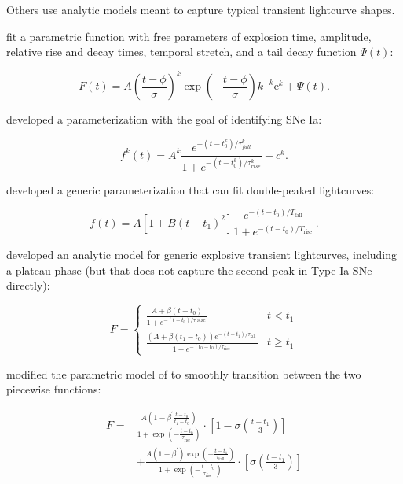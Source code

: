 \documentclass[DM,authoryear,toc]{lsstdoc}
\begin{document}
Others use analytic models meant to capture typical transient lightcurve shapes.

\citet{Newling:11:SNPhotCCClassification} fit a parametric function with free parameters of explosion time, amplitude, relative rise and decay times, temporal stretch, and a tail decay function $\Psi(t)$:

\begin{equation}
  F(t)=A\left(\frac{t-\phi}{\sigma}\right)^{k} \exp \left(-\frac{t-\phi}{\sigma}\right) k^{-k} \mathrm{e}^{k}+\Psi(t).
\end{equation}

\citet{Bazin:11:SNLSIas} developed a parameterization with the goal of identifying SNe Ia:

\begin{equation}
  f^{k}(t)=A^{k} \frac{e^{-\left(t-t_{0}^{k}\right) / \tau_{f a l l}^{k}}}{1+e^{-\left(t-t_{0}^{k}\right) / \tau_{r i s e}^{k}}}+c^{k}.
\end{equation}

\citet{Karpenka:13:SNClassification} developed a generic parameterization that can fit double-peaked lightcurves:

\begin{equation}
f(t)=A\left[1+B\left(t-t_{1}\right)^{2}\right] \frac{e^{-\left(t-t_{0}\right) / T_{\text {fall }}}}{1+e^{-\left(t-t_{0}\right) / T_{\text {rise }}}}.
\end{equation}

\citet{Villar:19:Supernova-Photo} developed an analytic model for generic explosive transient lightcurves, including a plateau phase (but that does not capture the second peak in Type Ia SNe directly):

\begin{equation}
F=\left\{\begin{array}{ll}{\frac{A+\beta\left(t-t_{0}\right)}{1+e^{-\left(t-t_{0}\right) / \tau \operatorname{sise}}}} & {t<t_{1}} \\ {\frac{\left(A+\beta\left(t_{1}-t_{0}\right)\right) e^{-\left(t-t_{1}\right) / \tau_{\text {fall }}}}{1+e^{-\left(t_{0}-t_{0}\right) / \tau_{\text {rise }}}}} & {t \geq t_{1}}\end{array}\right.
\end{equation}

\citet{Sanchez-Saez:21:AlertClassification} modified the parametric model of \citet{Villar:19:Supernova-Photo} to smoothly transition between the two piecewise functions:

\begin{equation}
\begin{aligned}
  F=& \frac{A\left(1-\beta^{\prime} \frac{t-t_{0}}{t_{1}-t_{0}}\right)}{1+\exp \left(-\frac{t-t_{0}}{\tau_{\text {rise }}}\right)} \cdot\left[1-\sigma\left(\frac{t-t_{1}}{3}\right)\right] \\
  &+\frac{A\left(1-\beta^{\prime}\right) \exp \left(-\frac{t-t_{1}}{\tau_{\text {tall }}}\right)}{1+\exp \left(-\frac{t-t_{0}}{\tau_{\text {rise }}}\right)} \cdot\left[\sigma\left(\frac{t-t_{1}}{3}\right)\right]
  \end{aligned}
\end{equation}
\end{document}
